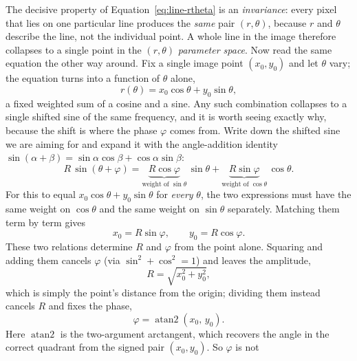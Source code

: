 The decisive property of Equation~\eqref{eq:line-rtheta} is an \emph{invariance}:
every pixel that lies on one particular line produces the \emph{same} pair
$(r,\theta)$, because $r$ and $\theta$ describe the line, not the individual
point. A whole line in the image therefore collapses to a single point in the
$(r,\theta)$ \emph{parameter space}. Now read the same equation the other way
around. Fix a single image point $(x_0,y_0)$ and let $\theta$ vary; the equation
turns into a function of $\theta$ alone,
\begin{equation}
  r(\theta) = x_0\cos\theta + y_0\sin\theta ,
  \label{eq:point-r-of-theta}
\end{equation}
\noindent
a fixed weighted sum of a cosine and a sine. Any such combination collapses to a
single shifted sine of the same frequency, and it is worth seeing exactly why,
because the shift is where the phase $\varphi$ comes from. Write down the shifted
sine we are aiming for and expand it with the angle-addition identity
$\sin(\alpha+\beta) = \sin\alpha\cos\beta + \cos\alpha\sin\beta$:
\begin{equation}
  R\,\sin(\theta + \varphi)
    = \underbrace{R\cos\varphi}_{\text{weight of }\sin\theta}\,\sin\theta
    + \underbrace{R\sin\varphi}_{\text{weight of }\cos\theta}\,\cos\theta .
  \label{eq:phase-expand}
\end{equation}
\noindent
For this to equal $x_0\cos\theta + y_0\sin\theta$ for \emph{every} $\theta$, the
two expressions must have the same weight on $\cos\theta$ and the same weight on
$\sin\theta$ separately. Matching them term by term gives
\begin{equation}
  x_0 = R\sin\varphi, \qquad y_0 = R\cos\varphi .
  \label{eq:phase-match}
\end{equation}
\noindent
These two relations determine $R$ and $\varphi$ from the point alone. Squaring and
adding them cancels $\varphi$ (via $\sin^2+\cos^2 = 1$) and leaves the amplitude,
\begin{equation}
  R = \sqrt{x_0^2 + y_0^2},
  \label{eq:phase-amp}
\end{equation}
\noindent
which is simply the point's distance from the origin; dividing them instead cancels
$R$ and fixes the phase,
\begin{equation}
  \varphi = \operatorname{atan2}(x_0,\, y_0).
  \label{eq:phase-phi}
\end{equation}
\noindent
Here $\operatorname{atan2}$ is the two-argument arctangent, which recovers the
angle in the correct quadrant from the signed pair $(x_0,y_0)$. So $\varphi$ is not
